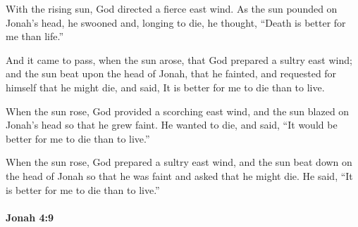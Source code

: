 			\begin{versebox}
					\item[BHS] 
					\item[LXX] 
					\item[AB 1990 300] With the rising sun, God directed a fierce east wind. As the sun pounded on Jonah's head, he swooned and, longing to die, he thought, ``Death is better for me than life.''
					\item[ASV] And it came to pass, when the sun arose, that God prepared a sultry east wind; and the sun beat upon the head of Jonah, that he fainted, and requested for himself that he might die, and said, It is better for me to die than to live.
					\item[NIV] When the sun rose, God provided a scorching east wind, and the sun blazed on Jonah’s head so that he grew faint. He wanted to die, and said, “It would be better for me to die than to live.”
					\item[NRSV] When the sun rose, God prepared a sultry east wind, and the sun beat down on the head of Jonah so that he was faint and asked that he might die. He said, “It is better for me to die than to live.”
			\end{versebox}

		\paragraph{Jonah 4:9} %
			\label{JONAH-4-9}

